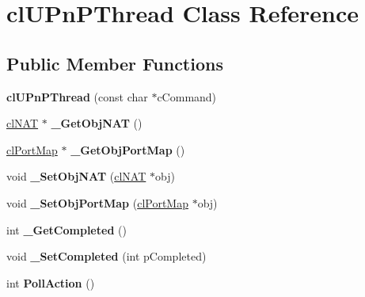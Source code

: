 \hypertarget{classcl_u_pn_p_thread}{
\section{clUPnPThread Class Reference}
\label{classcl_u_pn_p_thread}
}
\subsection*{Public Member Functions}
\begin{DoxyCompactItemize}
\item 
\hypertarget{classcl_u_pn_p_thread_a31748b062ab8337c8135330bb3e39d18}{
{\bfseries clUPnPThread} (const char $\ast$cCommand)}
\label{classcl_u_pn_p_thread_a31748b062ab8337c8135330bb3e39d18}

\item 
\hypertarget{classcl_u_pn_p_thread_a79302a565a99c7440f7b4ef65689bbc0}{
\hyperlink{structcl_n_a_t}{clNAT} $\ast$ {\bfseries \_\-GetObjNAT} ()}
\label{classcl_u_pn_p_thread_a79302a565a99c7440f7b4ef65689bbc0}

\item 
\hypertarget{classcl_u_pn_p_thread_a14eb4fa0f4d51e2891e8f82ebd82f468}{
\hyperlink{structcl_port_map}{clPortMap} $\ast$ {\bfseries \_\-GetObjPortMap} ()}
\label{classcl_u_pn_p_thread_a14eb4fa0f4d51e2891e8f82ebd82f468}

\item 
\hypertarget{classcl_u_pn_p_thread_a8a6b0612728d26dcff952be9c6a9ae4e}{
void {\bfseries \_\-SetObjNAT} (\hyperlink{structcl_n_a_t}{clNAT} $\ast$obj)}
\label{classcl_u_pn_p_thread_a8a6b0612728d26dcff952be9c6a9ae4e}

\item 
\hypertarget{classcl_u_pn_p_thread_aebde7eb0f1175ca356b2c6185618c47f}{
void {\bfseries \_\-SetObjPortMap} (\hyperlink{structcl_port_map}{clPortMap} $\ast$obj)}
\label{classcl_u_pn_p_thread_aebde7eb0f1175ca356b2c6185618c47f}

\item 
\hypertarget{classcl_u_pn_p_thread_a61e213c2f0edc90793d4f8c4e9118899}{
int {\bfseries \_\-GetCompleted} ()}
\label{classcl_u_pn_p_thread_a61e213c2f0edc90793d4f8c4e9118899}

\item 
\hypertarget{classcl_u_pn_p_thread_ac64559e70691bb734cf53535ddc16bc8}{
void {\bfseries \_\-SetCompleted} (int pCompleted)}
\label{classcl_u_pn_p_thread_ac64559e70691bb734cf53535ddc16bc8}

\item 
\hypertarget{classcl_u_pn_p_thread_aaace681132552441aa204b459c6217d2}{
int {\bfseries PollAction} ()}
\label{classcl_u_pn_p_thread_aaace681132552441aa204b459c6217d2}


\end{DoxyCompactItemize}
